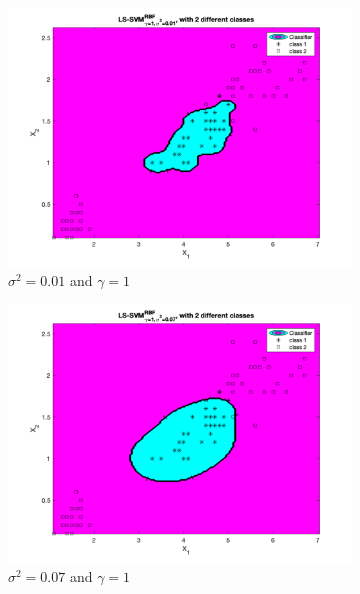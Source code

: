 \documentclass[a4paper, 11pt, one column]{article}
\begin{document}
\begin{figure}[]
        \begin{subfigure}{0.33\linewidth}
            \includegraphics[width=\linewidth]{images/ls_svm_rbg_g1_s0.01.png}
            \caption{$\sigma^2=0.01$ and $\gamma=1$}
        \end{subfigure}
        \begin{subfigure}{0.33\linewidth}
            \includegraphics[width=\linewidth]{images/ls_svm_rbg_g1_s0.07.png}
            \caption{$\sigma^2=0.07$ and $\gamma=1$}
        \end{subfigure}
        \begin{subfigure}{0.33\linewidth}

\end{subfigure}
\end{figure}
\end{document}
